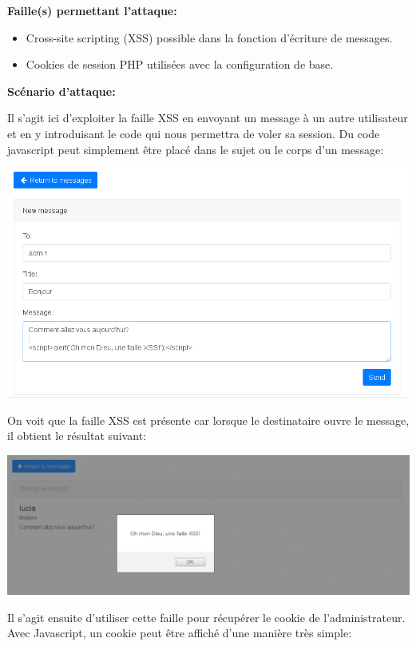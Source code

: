 \documentclass{article}
\begin{document}
\textbf{Faille(s) permettant l'attaque:}

\begin{itemize}

\item
  Cross-site scripting (XSS) possible dans la fonction d'écriture de
  messages.
\item
  Cookies de session PHP utilisées avec la configuration de base.
\end{itemize}

\textbf{Scénario d'attaque:}

Il s'agit ici d'exploiter la faille XSS en envoyant un message à un
autre utilisateur et en y introduisant le code qui nous permettra de
voler sa session. Du code javascript peut simplement être placé dans le
sujet ou le corps d'un message:

\includegraphics{images/xss1.png}

On voit que la faille XSS est présente car lorsque le destinataire ouvre
le message, il obtient le résultat suivant:

\includegraphics{images/xss2.png}

Il s'agit ensuite d'utiliser cette faille pour récupérer le cookie de
l'administrateur. Avec Javascript, un cookie peut être affiché d'une
manière très simple:
\end{document}
